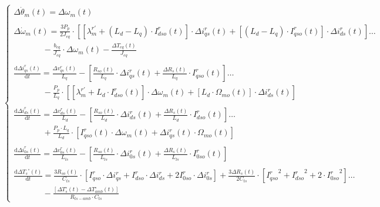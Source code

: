 \documentclass[10pt]{article}
\begin{document}
\begin{enumerate}
	\begin{equation}
		\label{eqn:sistPequeniasDesviaciones}
		\begin{cases}
			\Delta\dot{\theta}_{m}(t)=\Delta\omega_{m}(t)
			\\
			\\
			\Delta\dot{\omega }_{m}(t)=\frac{3 P_{p}}{2 J_{eq}}\cdot \left [[\lambda_{m}^{r'}+\left ( L_{d}-L_{q} \right )\cdot I_{dso}^{r} (t)]\cdot\Delta i_{qs}^{r}(t)+[\left ( L_{d}-L_{q} \right )\cdot I_{qso}^{r}(t)]\cdot\Delta i_{ds}^{r} (t)\right ]\dots \\  \ \ \ \ \ \ \  \  \ \  \ \  \ \ \ \ - \frac{b_{eq}}{J_{eq}}\cdot\Delta\omega_{m}(t)-\frac{\Delta T_{eq}(t)}{J_{eq}}
			\\
			\\
			\frac{\mathrm{d} \Delta i_{qs}^{r}\left ( t \right )}{\mathrm{d} t}=\frac{\Delta v_{qs}^{r}(t)}{L_{q}}-\left [ \frac{R_{so}\left ( t \right )}{L_{q}}\cdot \Delta i_{qs}^{r}(t)+\frac{\Delta R_{s}(t)}{L_{q}}\cdot I_{qso}^{r}(t) \right ]\dots \\ \ \ \ \ \ \ \  \  \ \  \ \  \ \ \ \ -\frac{P_{p}}{L_{q}}\cdot\left [[\lambda_{m}^{r'}+L_{d}\cdot I_{dso}^{r}(t)]\cdot\Delta \omega_{m}(t)+[L_{d}\cdot \Omega_{mo}(t)]\cdot \Delta i_{ds}^{r}(t)\right ]
			\\
			\\
			\frac{\mathrm{d}\Delta i_{ds}^{r}\left ( t \right )}{\mathrm{d} t}=\frac{\Delta v_{ds}^{r}(t)}{L_{d}}-\left [ \frac{R_{so}\left ( t \right )}{L_{d}}\cdot \Delta i_{ds}^{r}(t)+\frac{\Delta R_{s}\left ( t \right )}{L_{d}}\cdot I_{dso}^{r}(t) \right ]\dots \\ \ \ \ \ \ \ \  \  \ \  \ \  \ \ \ \ +\frac{P_{p}\cdot L_{q}}{L_{d}}\cdot\left [  I_{qso}^{r}(t)\cdot \Delta\omega_{m}(t)+\Delta i_{qs}^{r}(t)\cdot \Omega_{mo}(t) \right ]
			\\
			\\
			\frac{\mathrm{d}\Delta i_{0s}^{r}\left ( t \right )}{\mathrm{d} t}=\frac{\Delta v_{0s}^{r}(t)}{L_{ls}}-\left [ \frac{R_{so}\left ( t \right )}{L_{ls}}\cdot \Delta i_{0s}^{r}(t)+\frac{\Delta R_{s}\left ( t \right )}{L_{ls}}\cdot I_{0so}^{r}(t) \right ]
			\\
			\\
			\frac{\mathrm{d} {\Delta T_{s}}^{\circ}\left ( t \right )}{\mathrm{d} t}=\frac{3R_{so}(t)}{C_{ts}}\cdot \left [ I_{qso}^{r} \cdot \Delta i_{qs}^{r}+I_{dso}^{r} \cdot \Delta i_{ds}^{r}+2I_{0so}^{r} \cdot \Delta i_{0s}^{r} \right ]+\frac{3\Delta R_{s}(t)}{2 C_{ts}}\cdot\left [ {I_{qso}^{r}}^{2}+{I_{dso}^{r}}^{2}+2\cdot{I_{0so}^{r}}^{2} \right ]\dots \\ \ \ \ \ \ \ \  \  \ \  \ \  \ \ \ \ -\frac{\left [\Delta T_{s}^{\circ}\left ( t \right )  - \Delta T_{amb}^{\circ}\left ( t \right ) \right ]}{R_{ts-amb}\cdot C_{ts}}

\end{cases}
\end{equation}
\end{enumerate}
\end{document}

